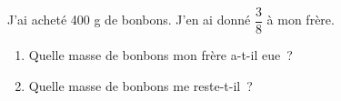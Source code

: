 \documentclass[exercice]{thedocument}%
\begin{document}
%
J'ai acheté 400 g de bonbons. J'en ai donné $\dfrac38$ à mon frère.
\begin{enumerate}
    \item Quelle masse de bonbons mon frère a-t-il eue~?
    \item Quelle masse de bonbons me reste-t-il~?
\end{enumerate}
\end{document}
